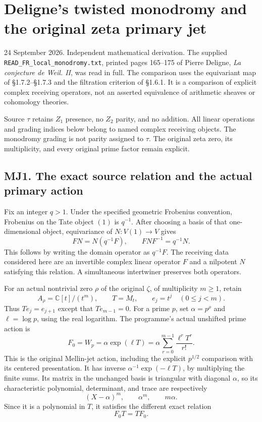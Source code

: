 \section{Deligne's twisted monodromy and the original zeta primary
jet}\label{delignes-twisted-monodromy-and-the-original-zeta-primary-jet}

24 September 2026. Independent mathematical derivation. The supplied
\nolinkurl{READ_FR_local_monodromy.txt}, printed pages 165--175 of
Pierre Deligne, \emph{La conjecture de Weil. II}, was read in full. The
comparison uses the equivariant map of §1.7.2--§1.7.3 and the filtration
criterion of §1.6.1. It is a comparison of explicit complex receiving
operators, not an asserted equivalence of arithmetic sheaves or
cohomology theories.

Source \(\tau\) retains \(Z_1\) presence, no \(Z_2\) parity, and no
addition. All linear operations and grading indices below belong to
named complex receiving objects. The monodromy grading is not parity
assigned to \(\tau\). The original zeta zero, its multiplicity, and
every original prime factor remain explicit.

\subsection{MJ1. The exact source relation and the actual primary
action}\label{mj1.-the-exact-source-relation-and-the-actual-primary-action}

Fix an integer \(q>1\). Under the specified geometric Frobenius
convention, Frobenius on the Tate object \((1)\) is \(q^{-1}\). After
choosing a basis of that one-dimensional object, equivariance of
\(N:V(1)\to V\) gives \[
FN=N(q^{-1}F),\qquad FNF^{-1}=q^{-1}N.
\tag{MJ1.1}
\] This follows by writing the domain operator as \(q^{-1}F\). The
receiving data considered here are an invertible complex linear operator
\(F\) and a nilpotent \(N\) satisfying this relation. A simultaneous
intertwiner preserves both operators.

For an actual nontrivial zero \(\rho\) of the original \(\zeta\), of
multiplicity \(m\ge1\), retain \[
A_\rho=\mathbb C[t]/(t^m),\qquad T=M_t,\qquad e_j=t^j\quad(0\le j<m).
\tag{MJ1.2}
\] Thus \(Te_j=e_{j+1}\) except that \(Te_{m-1}=0\). For a prime \(p\),
set \(\alpha=p^\rho\) and \(\ell=\log p\), using the real logarithm. The
programme's actual unshifted prime action is \[
F_0=W_p=\alpha\exp(\ell T)
=\alpha\sum_{r=0}^{m-1}\frac{\ell^rT^r}{r!}.
\tag{MJ1.3}
\] This is the original Mellin-jet action, including the explicit
\(p^{1/2}\) comparison with its centered presentation. It has inverse
\(\alpha^{-1}\exp(-\ell T)\), by multiplying the finite sums. Its matrix
in the unchanged basis is triangular with diagonal \(\alpha\), so its
characteristic polynomial, determinant, and trace are respectively \[
(X-\alpha)^m,\qquad\alpha^m,\qquad m\alpha.
\] Since it is a polynomial in \(T\), it satisfies the different exact
relation \[
F_0T=TF_0.
\tag{MJ1.4}
\]


